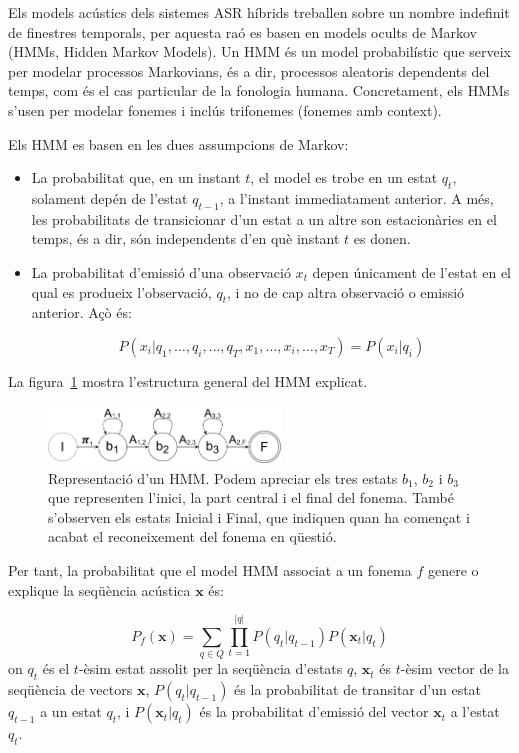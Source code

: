 Els models acústics dels sistemes ASR híbrids treballen sobre un nombre indefinit de finestres temporals, per aquesta raó es basen en models ocults de Markov (HMMs, Hidden Markov Models). Un HMM és un model probabilístic que serveix per modelar processos Markovians, és a dir, processos aleatoris dependents del temps, com és el cas particular de la fonologia humana. Concretament, els HMMs s'usen per modelar fonemes i inclús trifonemes (fonemes amb context).

Els HMM es basen en les dues assumpcions de Markov:
\begin{itemize}
    \item La probabilitat que, en un instant $t$, el model es trobe en un estat $q_t$, solament depén de l'estat $q_{t-1}$, a l'instant immediatament anterior. A més, les probabilitats de transicionar d'un estat a un altre son estacionàries en el temps, és a dir, són independents d'en què instant $t$ es donen.
    \item La probabilitat d'emissió d'una observació $x_t$ depen únicament de l'estat en el qual es produeix l'observació, $q_t$, i no de cap altra observació o emissió anterior. Açò és:

    \begin{equation}
        P(x_i|q_1, \dots, q_i, \dots, q_T, x_1, \dots, x_i, \dots, x_T) = P(x_i|q_i)
    \end{equation}
\end{itemize}

La figura~\ref{fig:estructura_hmm} mostra l'estructura general del HMM explicat.

\begin{figure}[ht!]
\centering
\includegraphics[width=0.55\textwidth]{figuras/estructura_hmm.pdf}
\caption{Representació d'un HMM. Podem apreciar els tres estats $b_1$, $b_2$ i $b_3$ que representen l'inici, la part central i el final del fonema. També s'observen els estats Inicial i Final, que indiquen quan ha començat i acabat el reconeixement del fonema en qüestió.}
\label{fig:estructura_hmm}
\end{figure}

Per tant, la probabilitat que el model HMM associat a un fonema $f$ genere o explique la seqüència acústica $\textbf{x}$ és:

\begin{equation}
    P_f(\textbf{x}) = \sum_{q \in Q} \prod_{t=1}^{|q|} P(q_t|q_{t-1}) P(\textbf{x}_t|q_t)
    \label{eq:hmm_prob}
\end{equation}
on $q_t$ és el $t$-èsim estat assolit per la seqüència d'estats $q$, $\textbf{x}_t$ és $t$-èsim vector de la seqüència de vectors $\textbf{x}$, $P(q_t|q_{t-1})$ és la probabilitat de transitar d'un estat $q_{t-1}$ a un estat $q_t$, i $P(\textbf{x}_t|q_t)$ és la probabilitat d'emissió del vector $\textbf{x}_t$ a l'estat $q_t$.

